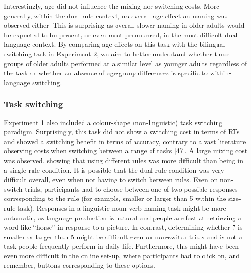 \documentclass[
]{article}
\begin{document}
Interestingly, age did not influence the mixing nor switching costs. More generally, within the dual-rule context, no overall age effect on naming was observed either. This is surprising as overall slower naming in older adults would be expected to be present, or even most pronounced, in the most-difficult dual language context. By comparing age effects on this task with the bilingual switching task in Experiment 2, we aim to better understand whether these groups of older adults performed at a similar level as younger adults regardless of the task or whether an absence of age-group differences is specific to within-language switching.

\hypertarget{task-switching}{%
\subsubsection{Task switching}\label{task-switching}}

Experiment 1 also included a colour-shape (non-linguistic) task switching paradigm. Surprisingly, this task did not show a switching cost in terms of RTs and showed a switching benefit in terms of accuracy, contrary to a vast literature observing costs when switching between a range of tasks {[}47{]}. A large mixing cost was observed, showing that using different rules was more difficult than being in a single-rule condition. It is possible that the dual-rule condition was very difficult overall, even when not having to switch between rules. Even on non-switch trials, participants had to choose between one of two possible responses corresponding to the rule (for example, smaller or larger than 5 within the size-rule task). Responses in a linguistic noun-verb naming task might be more automatic, as language production is natural and people are fast at retrieving a word like ``horse'' in response to a picture. In contrast, determining whether 7 is smaller or larger than 5 might be difficult even on non-switch trials and is not a task people frequently perform in daily life. Furthermore, this might have been even more difficult in the online set-up, where participants had to click on, and remember, buttons corresponding to these options.
\end{document}
